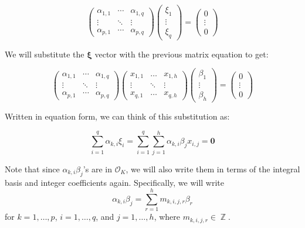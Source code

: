 \documentclass[a4paper, 11pt]{book}
\DeclareMathOperator{\Z}{\mathbb{Z}}
\begin{document}
{\[\begin{pmatrix}
        \alpha_{1,1} & \cdots & \alpha_{1,q} \\
        \vdots & \ddots & \vdots \\
        \alpha_{p,1} & \cdots & \alpha_{p,q} 
    \end{pmatrix}
    \begin{pmatrix}
        \xi_1 \\ \vdots \\ \xi_q
    \end{pmatrix} = \begin{pmatrix}
        0 \\ \vdots \\ 0
        \end{pmatrix}\]

        We will substitute the $\bm{\xi}$ vector with the previous matrix equation to get:

\[
    \begin{pmatrix}
        \alpha_{1,1} & \cdots & \alpha_{1,q} \\
        \vdots & \ddots & \vdots \\
        \alpha_{p,1} & \cdots & \alpha_{p,q} 
    \end{pmatrix}
    \begin{pmatrix}
    x_{1,1} & \hdots & x_{1,h} \\
    \vdots & \ddots & \vdots \\
    x_{q,1} & \hdots & x_{q,h} 
\end{pmatrix} 
\begin{pmatrix}
    \beta_1 \\ \vdots \\ \beta_h
\end{pmatrix} = 
\begin{pmatrix}
        0 \\ \vdots \\ 0
        \end{pmatrix}\]

Written in equation form, we can think of this substitution as: 

\[\sum\limits_{i = 1}^{q} \alpha_{k,i}\xi_i = \sum\limits_{i=1}^{q}\sum\limits_{j=1}^{h}\alpha_{k,i}\beta_{j}x_{i,j} = \mathbf{0}\]

Note that since $\alpha_{k,i}\beta_{j}$'s are in $\mathcal{O}_K$, we will also write them in terms of the integral basis and integer coefficients again. Specifically, we will write \[\alpha_{k,i}\beta_{j} = \sum\limits_{r = 1}^{h} m_{k,i,j,r}\beta_{r}\] for $k = 1, \ldots, p$, $i = 1, \ldots, q$, and $j = 1, \ldots, h$, where $m_{k,i,j,r} \in \Z$.

}
\end{document}
